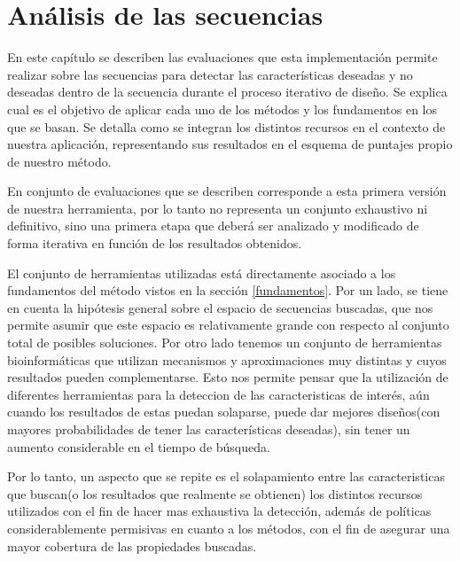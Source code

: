 \chapter{Análisis de las secuencias}
\label{tools}

En este capítulo se describen las evaluaciones que esta implementación permite realizar sobre las secuencias para detectar las características deseadas y no deseadas dentro de la secuencia durante el proceso iterativo de diseño. 
Se explica cual es el objetivo de aplicar cada uno de los métodos y los fundamentos en los que se basan.
Se detalla como se integran los distintos recursos en el contexto de nuestra aplicación, representando sus resultados en el esquema de puntajes propio de nuestro método.

En conjunto de evaluaciones que se describen corresponde a esta primera versión de nuestra herramienta, por lo tanto no representa un conjunto exhaustivo ni definitivo, 
sino una primera etapa que deberá ser analizado y modificado de forma iterativa en función de los resultados obtenidos.

El conjunto de herramientas utilizadas está directamente asociado a los fundamentos del método vistos en la sección \ref{fundamentos}.
Por un lado, se tiene en cuenta la hipótesis general sobre el espacio de secuencias buscadas, que nos permite asumir que este espacio es relativamente grande con respecto al conjunto total de posibles soluciones.
Por otro lado tenemos un conjunto de herramientas bioinformáticas que utilizan mecanismos y aproximaciones muy distintas y cuyos resultados pueden complementarse. 
Esto nos permite pensar que la utilización de diferentes herramientas para la deteccion de las caracteristicas de interés, aún cuando los resultados de estas puedan solaparse,
puede dar mejores diseños(con mayores probabilidades de tener las características deseadas), sin tener un aumento considerable en el tiempo de búsqueda.

Por lo tanto, un aspecto que se repite es el solapamiento entre las caracteristicas que buscan(o los resultados que realmente se obtienen) los distintos recursos utilizados con el fin de hacer mas exhaustiva la detección, 
además de políticas considerablemente permisivas en cuanto a los métodos, con el fin de asegurar una mayor cobertura de las propiedades buscadas.

